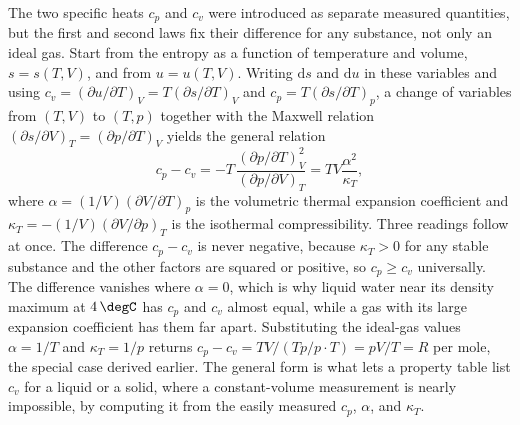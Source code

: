\begin{mastery}
The two specific heats $c_p$ and $c_v$ were introduced as separate
measured quantities, but the first and second laws fix their difference
for any substance, not only an ideal gas. Start from the entropy as a
function of temperature and volume, $s = s(T, V)$, and from
$u = u(T, V)$. Writing $\mathrm{d}s$ and $\mathrm{d}u$ in these variables
and using $c_v = (\partial u/\partial T)_V = T(\partial s/\partial T)_V$
and $c_p = T(\partial s/\partial T)_p$, a change of variables from
$(T, V)$ to $(T, p)$ together with the Maxwell relation
$(\partial s/\partial V)_T = (\partial p/\partial T)_V$ yields the
general relation
\[
c_p - c_v = -T\,\frac{(\partial p/\partial T)_V^2}
{(\partial p/\partial V)_T}
= T V \frac{\alpha^2}{\kappa_T},
\]
where $\alpha = (1/V)(\partial V/\partial T)_p$ is the volumetric thermal
expansion coefficient and $\kappa_T = -(1/V)(\partial V/\partial p)_T$ is
the isothermal compressibility. Three readings follow at once. The
difference $c_p - c_v$ is never negative, because $\kappa_T > 0$ for any
stable substance and the other factors are squared or positive, so
$c_p \geq c_v$ universally. The difference vanishes where $\alpha = 0$,
which is why liquid water near its density maximum at $4\,\degC$ has
$c_p$ and $c_v$ almost equal, while a gas with its large expansion
coefficient has them far apart. Substituting the ideal-gas values
$\alpha = 1/T$ and $\kappa_T = 1/p$ returns $c_p - c_v = TV/(Tp/p \cdot
T) = pV/T = R$ per mole, the special case derived earlier. The general
form is what lets a property table list $c_v$ for a liquid or a solid,
where a constant-volume measurement is nearly impossible, by computing it
from the easily measured $c_p$, $\alpha$, and $\kappa_T$.
\end{mastery}

